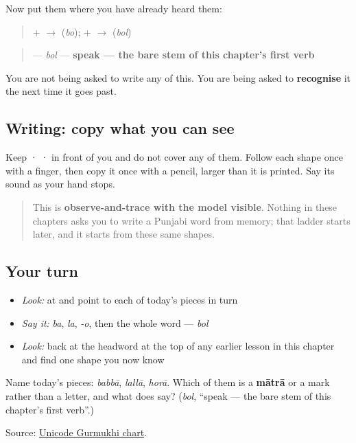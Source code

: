 Now put them where you have already heard them:

\begin{quote}
\textbf{} + \textbf{} $\to$ \textbf{} (\emph{bo});  \textbf{} + \textbf{} $\to$ \textbf{} (\emph{bol})
\end{quote}

\begin{quote}
\textbf{} — \emph{bol} — \textbf{speak — the bare stem of this chapter's first verb}
\end{quote}

You are not being asked to write any of this. You are being asked to \textbf{recognise} it the next time it goes past.

\subsection*{Writing: copy what you can see}
Keep  ·  ·  in front of you and do not cover any of them. Follow each shape once with a finger, then copy it once with a pencil, larger than it is printed. Say its sound as your hand stops.

\begin{quote}
This is \textbf{observe-and-trace with the model visible}. Nothing in these chapters asks you to write a Punjabi word from memory; that ladder starts later, and it starts from these same shapes.
\end{quote}

\subsection*{Your turn}
\begin{itemize}
\raggedright
  \item \emph{Look:} at \textbf{} and point to each of today's pieces in turn
  \item \emph{Say it:} \emph{ba}, \emph{la}, \emph{-o}, then the whole word — \emph{bol}
  \item \emph{Look:} back at the headword at the top of any earlier lesson in this chapter and find one shape you now know
\end{itemize}

\begin{tcolorbox}[breakable,colback=teal!4,colframe=teal!35!black,title={Before you move on}]
Name today's pieces: \emph{babbā}, \emph{lallā}, \emph{horā}. Which of them is a \textbf{mātrā} or a mark rather than a letter, and what does \textbf{} say? (\emph{bol}, “speak — the bare stem of this chapter's first verb”.)

Source: \href{https://www.unicode.org/charts/PDF/U0A00.pdf}{Unicode Gurmukhi chart}.
\end{tcolorbox}
